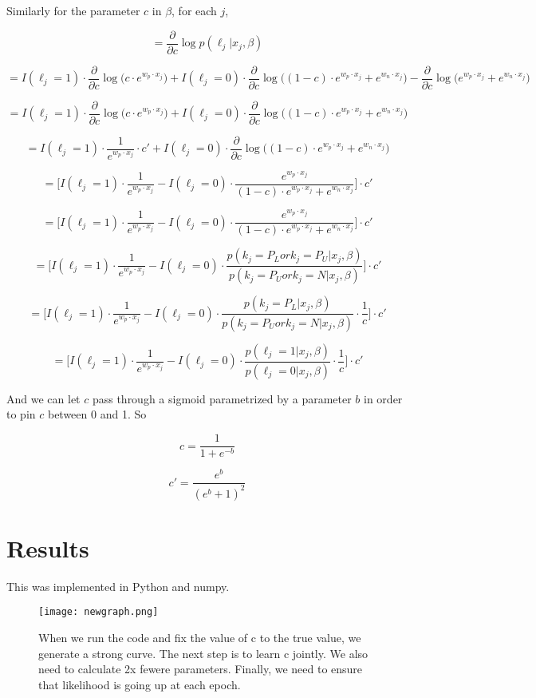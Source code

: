 \documentclass[]{article}
\begin{document}
Similarly for the parameter $c$ in $\beta$, for each $j$,

$$
 = \frac{\partial}{\partial c}\log{p(\ell_j | x_j, \beta)}
$$

$$
 = I(\ell_j=1) \cdot \frac{\partial}{\partial c}
		\log{\Big(
			 c \cdot e^{w_p \cdot x_j}
		\Big)} +
    I(\ell_j=0) \cdot \frac{\partial}{\partial c}
		\log{ \Big( (1 - c) \cdot e^{w_p \cdot x_j}  + e^{w_n \cdot x_j} \Big) }
		- \frac{\partial}{\partial c}
		 \log{\bigg(
			e^{w_p \cdot x_j} + e^{w_n \cdot x_j}
		\bigg)}
$$

$$
 = I(\ell_j=1) \cdot \frac{\partial}{\partial c}
		\log{\Big(
			 c \cdot e^{w_p \cdot x_j}
		\Big)} +
    I(\ell_j=0) \cdot \frac{\partial}{\partial c}
		\log{ \Big( (1 - c) \cdot e^{w_p \cdot x_j}  + e^{w_n \cdot x_j} \Big) }
$$

$$
 = I(\ell_j=1) \cdot \frac{1}{e^{w_p \cdot x_j}} \cdot c' +
    I(\ell_j=0) \cdot \frac{\partial}{\partial c}
		\log{ \Big( (1 - c) \cdot e^{w_p \cdot x_j}  + e^{w_n \cdot x_j} \Big) }
$$

$$
 = \Big[
    I(\ell_j=1) \cdot \frac{1}{e^{w_p \cdot x_j}} -
    I(\ell_j=0) \cdot \frac{e^{w_p \cdot x_j}}{(1 - c) \cdot e^{w_p \cdot x_j} + e^{w_n \cdot x_j}}
    \Big] \cdot c'
$$

$$
 = \Big[
    I(\ell_j=1) \cdot \frac{1}{e^{w_p \cdot x_j}} -
    I(\ell_j=0) \cdot \frac{e^{w_p \cdot x_j}}{(1 - c) \cdot e^{w_p \cdot x_j} + e^{w_n \cdot x_j}}
    \Big] \cdot c'
$$

$$
 = \Big[
    I(\ell_j=1) \cdot \frac{1}{e^{w_p \cdot x_j}} -
    I(\ell_j=0) \cdot \frac{p(k_j=P_L or k_j=P_U | x_j, \beta)}{p(k_j=P_U or k_j=N | x_j, \beta)}
    \Big] \cdot c'
$$

$$
 = \Big[
    I(\ell_j=1) \cdot \frac{1}{e^{w_p \cdot x_j}} -
    I(\ell_j=0) \cdot \frac{p(k_j=P_L | x_j, \beta)}{p(k_j=P_U or k_j=N | x_j, \beta)}  \cdot \frac{1}{c}
    \Big] \cdot c'
$$

$$
 = \Big[
    I(\ell_j=1) \cdot \frac{1}{e^{w_p \cdot x_j}} -
    I(\ell_j=0) \cdot \frac{p(\ell_j=1 | x_j, \beta)}{p(\ell_j=0 | x_j, \beta)}  \cdot \frac{1}{c}
    \Big] \cdot c'
$$

And we can let $c$ pass through a sigmoid parametrized by a parameter $b$ in order to pin $c$ between 0 and 1.  So

$$
c = \frac{1}{1 + e^{-b}}
$$

$$
c' = \frac{e^{b}}{(e^{b} + 1)^2}
$$

\section{Results}

This was implemented in Python and numpy.

\label{Reproduce Elkan 2008 graph with generated data}
\begin{figure}[ht!]
\centering
\texttt{[image: newgraph.png]}
\caption{When we run the code and fix the value of c to the true value, we generate a strong curve. The next step is to learn c jointly. We also need to calculate 2x fewere parameters. Finally, we need to ensure that likelihood is going up at each epoch.}
\end{figure}
\end{document}
